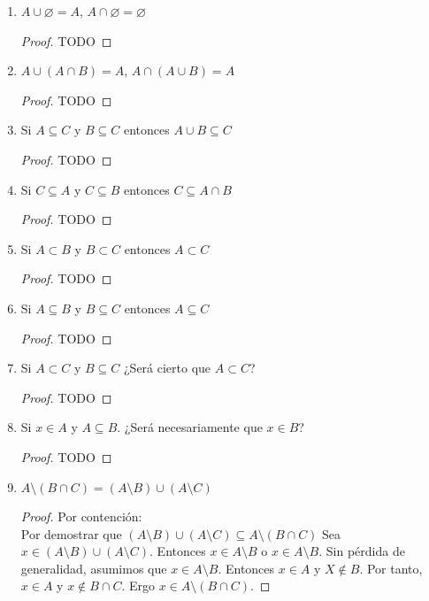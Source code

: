 \documentclass[11pt,letterpaper]{report}
\begin{document}
\begin{enumerate}
\begin{enumerate}[label=\alph*)]
    \item $A \cup \varnothing = A$, $A \cap \varnothing = \varnothing$
    \begin{proof}
        TODO
    \end{proof}

    \item $A \cup (A \cap B) = A$, $A \cap (A \cup B) = A$
    \begin{proof}
        TODO
    \end{proof}

    \item Si $A \subseteq C$ y $B \subseteq C$ entonces $A \cup B \subseteq C$
    \begin{proof}
        TODO
    \end{proof}

    \item Si $C \subseteq A$ y $C \subseteq B$ entonces $C \subseteq A \cap B$
    \begin{proof}
        TODO
    \end{proof}

    \item Si $A \subset B$ y $B \subset C$ entonces $A \subset C$
    \begin{proof}
        TODO
    \end{proof}

    \item Si $A \subseteq B$ y $B \subseteq C$ entonces $A \subseteq C$
    \begin{proof}
        TODO
    \end{proof}

    \item Si $A \subset C$ y $B \subseteq C$ ¿Será cierto que $A \subset C$?
    \begin{proof}
        TODO
    \end{proof}

    \item Si $x \in A$ y $A \subseteq B$. ¿Será necesariamente que $x \in B$?
    \begin{proof}
       TODO 
    \end{proof}

    \item $A \setminus (B \cap C) = (A \setminus B) \cup (A \setminus C)$ 
    \begin{proof}
        Por contención:\\
        Por demostrar que $(A \setminus B) \cup (A \setminus C) \subseteq A \setminus (B \cap C)$
        Sea $x \in (A \setminus B) \cup (A \setminus C)$. Entonces $x \in A \setminus B$
        o $x \in A \setminus B$. Sin pérdida de generalidad, asumimos que $x \in A \setminus B$.
        Entonces $x \in A$ y $X \notin B$. Por tanto, $x \in A$ y $x \notin B \cap C$.
        Ergo $x \in A \setminus (B \cap C)$.


\end{proof}
\end{enumerate}
\end{enumerate}
\end{document}
